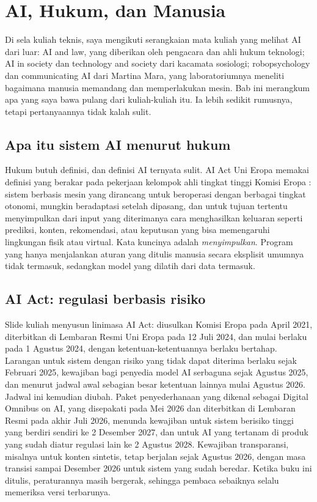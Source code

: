 \chapter{AI, Hukum, dan Manusia}
\label{ch:manusia}

Di sela kuliah teknis, saya mengikuti serangkaian mata kuliah yang melihat AI dari luar: AI and law,
yang diberikan oleh pengacara dan ahli hukum teknologi; AI in society dan technology and society dari
kacamata sosiologi; robopsychology dan communicating AI dari Martina Mara, yang laboratoriumnya meneliti
bagaimana manusia memandang dan memperlakukan mesin. Bab ini merangkum apa yang saya bawa pulang dari
kuliah-kuliah itu. Ia lebih sedikit rumusnya, tetapi pertanyaannya tidak kalah sulit.

\section{Apa itu sistem AI menurut hukum}

Hukum butuh definisi, dan definisi AI ternyata sulit. AI Act Uni Eropa \citep{aiact2024} memakai
definisi yang berakar pada pekerjaan kelompok ahli tingkat tinggi Komisi Eropa \citep{hleg2019}: sistem
berbasis mesin yang dirancang untuk beroperasi dengan berbagai tingkat otonomi, mungkin beradaptasi
setelah dipasang, dan untuk tujuan tertentu menyimpulkan dari input yang diterimanya cara menghasilkan
keluaran seperti prediksi, konten, rekomendasi, atau keputusan yang bisa memengaruhi lingkungan fisik
atau virtual. Kata kuncinya adalah \emph{menyimpulkan}. Program yang hanya menjalankan aturan yang ditulis
manusia secara eksplisit umumnya tidak termasuk, sedangkan model yang dilatih dari data termasuk.

\section{AI Act: regulasi berbasis risiko}

Slide kuliah menyusun linimasa AI Act: diusulkan Komisi Eropa pada April 2021, diterbitkan di Lembaran
Resmi Uni Eropa pada 12 Juli 2024, dan mulai berlaku pada 1 Agustus 2024, dengan ketentuan-ketentuannya
berlaku bertahap. Larangan untuk sistem dengan risiko yang tidak dapat diterima berlaku sejak Februari
2025, kewajiban bagi penyedia model AI serbaguna sejak Agustus 2025, dan menurut jadwal awal sebagian
besar ketentuan lainnya mulai Agustus 2026. Jadwal ini kemudian diubah. Paket penyederhanaan yang
dikenal sebagai Digital Omnibus on AI, yang disepakati pada Mei 2026 dan diterbitkan di Lembaran Resmi
pada akhir Juli 2026, menunda kewajiban untuk sistem berisiko tinggi yang berdiri sendiri ke 2 Desember
2027, dan untuk AI yang tertanam di produk yang sudah diatur regulasi lain ke 2 Agustus 2028. Kewajiban
transparansi, misalnya untuk konten sintetis, tetap berjalan sejak Agustus 2026, dengan masa transisi
sampai Desember 2026 untuk sistem yang sudah beredar. Ketika buku ini ditulis, peraturannya masih
bergerak, sehingga pembaca sebaiknya selalu memeriksa versi terbarunya.


